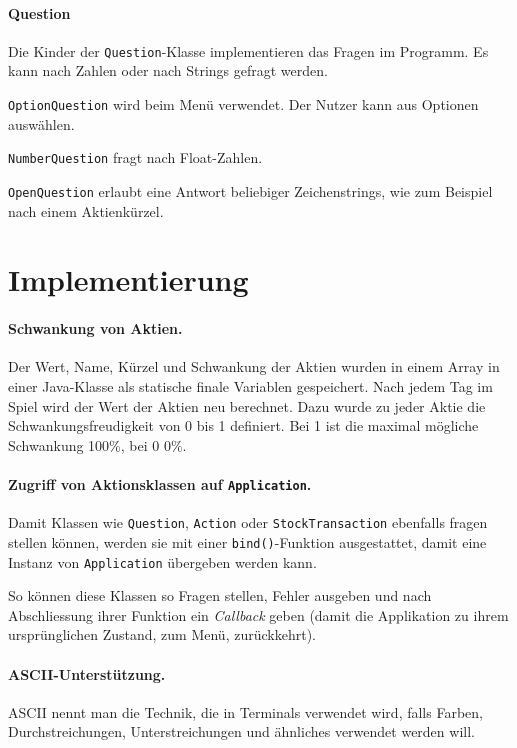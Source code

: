 \documentclass[paper=a4, fontsize=11pt]{scrartcl}
\numberwithin{equation}{section}		%
\numberwithin{figure}{section}			%
\numberwithin{table}{section}				%
\begin{document}
	\paragraph{Question}
	
	Die Kinder der \texttt{Question}-Klasse implementieren das Fragen im Programm. Es kann nach Zahlen oder nach Strings gefragt werden.
	
	\texttt{OptionQuestion} wird beim Menü verwendet. Der Nutzer kann aus Optionen auswählen.
	
	\texttt{NumberQuestion} fragt nach Float-Zahlen.
	
	\texttt{OpenQuestion} erlaubt eine Antwort beliebiger Zeichenstrings, wie zum Beispiel nach einem Aktienkürzel.
	
	\section{Implementierung}
	
	\paragraph{Schwankung von Aktien.} Der Wert, Name, Kürzel und Schwankung der Aktien wurden in einem Array in einer Java-Klasse als statische finale Variablen gespeichert. Nach jedem Tag im Spiel wird der Wert der Aktien neu berechnet. Dazu wurde zu jeder Aktie die Schwankungsfreudigkeit von 0 bis 1 definiert. Bei 1 ist die maximal mögliche Schwankung 100\%, bei 0 0\%.
	
	\paragraph{Zugriff von Aktionsklassen auf \texttt{Application}.} Damit Klassen wie \texttt{Question}, \texttt{Action} oder \texttt{StockTransaction} ebenfalls fragen stellen können, werden sie mit einer \texttt{bind()}-Funktion ausgestattet, damit eine Instanz von \texttt{Application} übergeben werden kann.
	
	So können diese Klassen so Fragen stellen, Fehler ausgeben und nach Abschliessung ihrer Funktion ein \textit{Callback} geben (damit die Applikation zu ihrem ursprünglichen Zustand, zum Menü, zurückkehrt).
	
	\paragraph{ASCII-Unterstützung.} ASCII nennt man die Technik, die in Terminals verwendet wird, falls Farben, Durchstreichungen, Unterstreichungen und ähnliches verwendet werden will.
	
\end{document}
